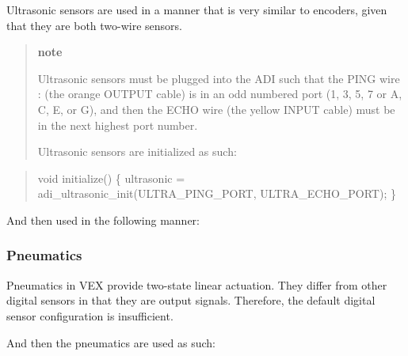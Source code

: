 Ultrasonic sensors are used in a manner that is very similar to encoders, given that they are both two-\/wire sensors.

\begin{quote}
{\bfseries note}

Ultrasonic sensors must be plugged into the A\+DI such that the P\+I\+NG wire \+: (the orange O\+U\+T\+P\+UT cable) is in an odd numbered port (1, 3, 5, 7 or \textquotesingle{}A\textquotesingle{}, \textquotesingle{}C\textquotesingle{}, \textquotesingle{}E\textquotesingle{}, or \textquotesingle{}G\textquotesingle{}), and then the E\+C\+HO wire (the yellow I\+N\+P\+UT cable) must be in the next highest port number.

Ultrasonic sensors are initialized as such\+: \end{quote}


\begin{quote}

\begin{DoxyCode}
void initialize() \{
  ultrasonic = adi\_ultrasonic\_init(ULTRA\_PING\_PORT, ULTRA\_ECHO\_PORT);
\}
\end{DoxyCode}
 \end{quote}


And then used in the following manner\+:

\subsubsection*{Pneumatics}

Pneumatics in V\+EX provide two-\/state linear actuation. They differ from other digital sensors in that they are output signals. Therefore, the default digital sensor configuration is insufficient.

And then the pneumatics are used as such\+: 